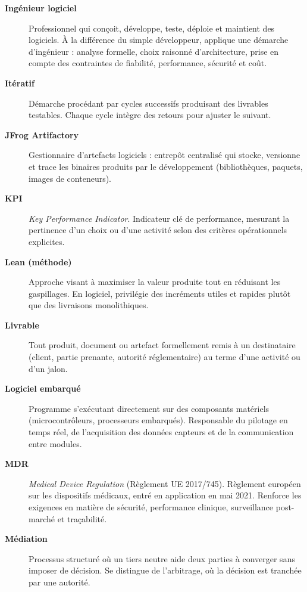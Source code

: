 \begin{description}
  \item[\textbf{Ingénieur logiciel}] Professionnel qui conçoit, développe, teste, déploie et maintient des logiciels. À la différence du simple développeur, applique une démarche d'ingénieur : analyse formelle, choix raisonné d'architecture, prise en compte des contraintes de fiabilité, performance, sécurité et coût.

  \item[\textbf{Itératif}] Démarche procédant par cycles successifs produisant des livrables testables. Chaque cycle intègre des retours pour ajuster le suivant.

  \item[\textbf{JFrog Artifactory}] Gestionnaire d'artefacts logiciels : entrepôt centralisé qui stocke, versionne et trace les binaires produits par le développement (bibliothèques, paquets, images de conteneurs).

  \item[\textbf{KPI}] \textit{Key Performance Indicator}. Indicateur clé de performance, mesurant la pertinence d'un choix ou d'une activité selon des critères opérationnels explicites.

  \item[\textbf{Lean (méthode)}] Approche visant à maximiser la valeur produite tout en réduisant les gaspillages. En logiciel, privilégie des incréments utiles et rapides plutôt que des livraisons monolithiques.

  \item[\textbf{Livrable}] Tout produit, document ou artefact formellement remis à un destinataire (client, partie prenante, autorité réglementaire) au terme d'une activité ou d'un jalon.

  \item[\textbf{Logiciel embarqué}] Programme s'exécutant directement sur des composants matériels (microcontrôleurs, processeurs embarqués). Responsable du pilotage en temps réel, de l'acquisition des données capteurs et de la communication entre modules.

  \item[\textbf{MDR}] \textit{Medical Device Regulation} (Règlement UE 2017/745). Règlement européen sur les dispositifs médicaux, entré en application en mai 2021. Renforce les exigences en matière de sécurité, performance clinique, surveillance post-marché et traçabilité.

  \item[\textbf{Médiation}] Processus structuré où un tiers neutre aide deux parties à converger sans imposer de décision. Se distingue de l'arbitrage, où la décision est tranchée par une autorité.


\end{description}
